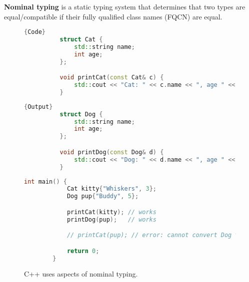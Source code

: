   \begin{definition}
    \textbf{Nominal typing} is a static typing system that determines that two types are equal/compatible if their fully qualified class names (FQCN) are equal. 

    \begin{figure}[H]
      \centering 
      \noindent\begin{minipage}{.5\textwidth}
        \begin{lstlisting}[language=C++]{Code}
          struct Cat {
              std::string name;
              int age;
          };

          void printCat(const Cat& c) {
              std::cout << "Cat: " << c.name << ", age " << c.age << "\n";
          }        
        \end{lstlisting}
        \end{minipage}
        \hfill
        \begin{minipage}{.49\textwidth}
        \begin{lstlisting}[language=C++]{Output}
          struct Dog {
              std::string name;
              int age;
          };

          void printDog(const Dog& d) {
              std::cout << "Dog: " << d.name << ", age " << d.age << "\n";
          }
        \end{lstlisting}
      \end{minipage}

      \begin{lstlisting}[language=C++]
        int main() {
            Cat kitty{"Whiskers", 3};
            Dog pup{"Buddy", 5};

            printCat(kitty); // works
            printDog(pup);   // works

            // printCat(pup); // error: cannot convert Dog to Cat (nominal typing)

            return 0;
        } 
      \end{lstlisting}
      \caption{C++ uses aspects of nominal typing.} 
      \label{fig:cpp_nominal}
    \end{figure}
  \end{definition}

